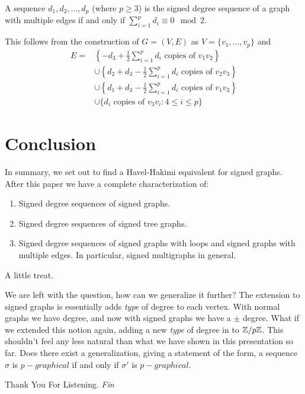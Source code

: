 \begin{frame}
	\begin{theorem}
		A sequence $d_1, d_2, ..., d_p$ (where $p \geq 3$) is the signed degree sequence of a graph with multiple edges if and only if $\sum_{i = 1}^{p} d_i \equiv 0 \mod 2$.
	\end{theorem}
	This follows from the construction of $G = (V,E)$ as $V = \{ v_1, ..., v_p \}$ and 
		\begin{align*}
			E = 
				& \left\{ -d_3 + \frac{1}{2}\sum_{i = 1}^{p} d_i \text{ copies of }  v_1v_2\right\} \\
				& \cup \left\{ d_2 + d_3 - \frac{1}{2}\sum_{i = 1}^{p} d_i \text{ copies of } v_2v_3\right\} \\
				& \cup \left\{ d_1 + d_3 - \frac{1}{2}\sum_{i = 1}^{p} d_i \text{ copies of } v_1v_3\right\} \\ 
				& \cup \{ d_i \text{ copies of } v_3v_i : 4 \leq i \leq p \}
		\end{align*}
\end{frame}



\section{Conclusion}


\begin{frame}
	In summary, we set out to find a Havel-Hakimi equivalent for signed graphs. After this paper we have a complete characterization of:
		\begin{enumerate}
			\item Signed degree sequences of signed graphs.
			\item Signed degree sequences of signed tree graphs.
			\item Signed degree sequences of signed graphs with loops and signed graphs with multiple edges. In particular, signed multigraphs in general.
		\end{enumerate}
\end{frame}


\begin{frame}{A little treat.}
	\begin{problem}
		We are left with the question, how can we generalize it further?
		The extension to signed graphs is essentially adds \textit{type} of degree to each vertex. With normal graphs we have degree, and now with signed graphs we have a $\pm$ degree.
		What if we extended this notion again, adding a new \textit{type} of degree in to $\Bbb Z/p \Bbb Z$. This shouldn't feel any less natural than what we have shown in this presentation so far.
		Does there exist a generalization, giving a statement of the form, a sequence $\sigma$ is $p-graphical$ if and only if $\sigma'$ is $p-graphical$.
	\end{problem}
\end{frame}

\begin{frame}{Thank You For Listening.}
	\centering \Huge
	\emph{Fin}
\end{frame}
